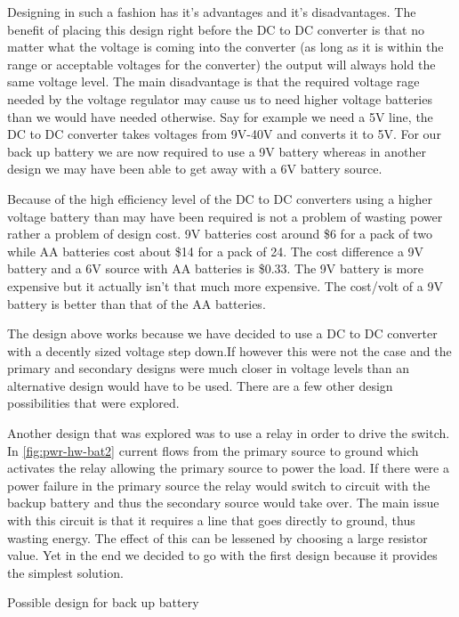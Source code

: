 Designing in such a fashion has it{}'s advantages and it{}'s disadvantages. The
benefit of placing this design right before the DC to DC converter is that no
matter what the voltage is coming into the converter (as long as it is within
the range or acceptable voltages for the converter) the output will always hold
the same voltage level. The main disadvantage is that the required voltage rage
needed by the voltage regulator may cause us to need higher voltage batteries
than we would have needed otherwise. Say for example we need a 5V line, the DC
to DC converter takes voltages from 9V{}-40V and converts it to 5V. For our
back up battery we are now required to use a 9V battery whereas in another
design we may have been able to get away with a 6V battery source.

Because of the high efficiency level of the DC to DC converters using a higher
voltage battery than may have been required is not a problem of wasting power
rather a problem of design cost. 9V batteries cost around \$6 for a pack of two
while AA batteries cost about \$14 for a pack of 24. The cost difference a 9V
battery and a 6V source with AA batteries is \$0.33. The 9V battery is more
expensive but it actually isn{}'t that much more expensive. The cost/volt of a
9V battery is better than that of the AA batteries.

The design above works because we have decided to use a DC to DC converter with
a decently sized voltage step down.If however this were not the case and the
primary and secondary designs were much closer in voltage levels than an
alternative design would have to be used. There are a few other design
possibilities that were explored.

Another design that was explored was to use a relay in order to drive the
switch. In \autoref{fig:pwr-hw-bat2} current flows from the primary source to
ground which activates the relay allowing the primary source to power the load.
If there were a power failure in the primary source the relay would switch to
circuit with the backup battery and thus the secondary source would take over.
The main issue with this circuit is that it requires a line that goes directly
to ground, thus wasting energy. The effect of this can be lessened by choosing
a large resistor value. Yet in the end we decided to go with the first design
because it provides the simplest solution.

{Possible design for back up battery\protect\footnotemark}

